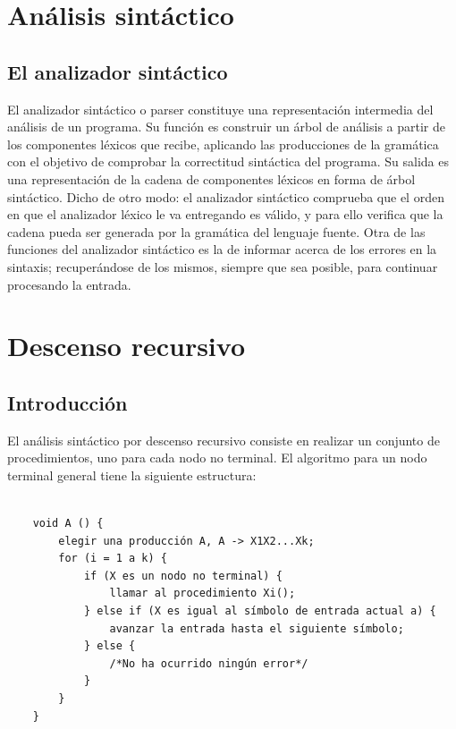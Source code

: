 \documentclass[11pt, english]{article}
\begin{document}
\newpage

\section{Análisis sintáctico}

\subsection{El analizador sintáctico}

El analizador sintáctico o parser constituye una representación intermedia del análisis de un programa. Su función es construir un árbol de análisis a partir de los componentes léxicos que recibe, aplicando las producciones de la gramática con el objetivo de comprobar la correctitud sintáctica del programa. Su salida es una representación de la cadena de componentes léxicos en forma de árbol sintáctico.
\newline
\newline
Dicho de otro modo: el analizador sintáctico comprueba que el orden en que el analizador léxico le va entregando es válido, y para ello verifica que la cadena pueda ser generada por la gramática del lenguaje fuente.
\newline
\newline
Otra de las funciones del analizador sintáctico es la de informar acerca de los errores en la sintaxis; recuperándose de los mismos, siempre que sea posible, para continuar procesando la entrada.

\newpage

\section{Descenso recursivo}

\subsection{Introducción}

El análisis sintáctico por descenso recursivo consiste en realizar un conjunto de procedimientos, uno para cada nodo no terminal. El algoritmo para un nodo terminal general tiene la siguiente estructura:

\begin{lstlisting}
	
	void A () {
		elegir una producción A, A -> X1X2...Xk;
		for (i = 1 a k) {
			if (X es un nodo no terminal) {
				llamar al procedimiento Xi();
			} else if (X es igual al símbolo de entrada actual a) {
				avanzar la entrada hasta el siguiente símbolo;
			} else {
				/*No ha ocurrido ningún error*/
			}
		}
	}
	
\end{lstlisting}
\end{document}
